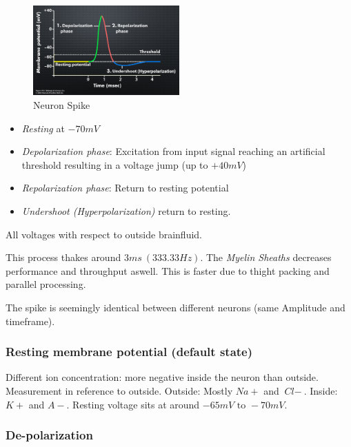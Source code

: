 \documentclass[
    fontsize      = 11pt,
    paper         = a4,
    twoside       = false,
    parskip       = half,
    pagesize      = false,
]{scrartcl}
\providecommand{\tightlist}{%
  \setlength{\itemsep}{0pt}\setlength{\parskip}{0pt}}
\begin{document}
\begin{figure}[htp]
\centering
\includegraphics[width=0.5\textwidth]{neuron-spike.png}
\caption{Neuron Spike}
\end{figure}

\begin{itemize}
\tightlist
\item
  \emph{Resting} at \(-70\si{mV}\)
\item
  \emph{Depolarization phase}: Excitation from input signal reaching an
  artificial threshold resulting in a voltage jump (up to
  \(+40\si{mV}\))
\item
  \emph{Repolarization phase}: Return to resting potential
\item
  \emph{Undershoot (Hyperpolarization)} return to resting.
\end{itemize}

All voltages with respect to outside brainfluid.

This process thakes around \(3\si{ms}\ \left( 333.33\si{Hz} \right)\).
The \emph{Myelin Sheaths} decreases performance and throughput aswell.
This is faster due to thight packing and parallel processing.

The spike is seemingly identical between different neurons (same
Amplitude and timeframe).

\hypertarget{resting-membrane-potential-default-state}{%
\subsubsection{Resting membrane potential (default
state)}\label{resting-membrane-potential-default-state}}

Different ion concentration: more negative inside the neuron than
outside. Measurement in reference to outside. Outside: Mostly
\(\mathit{Na}+\) and \(\textit{Cl}-\). Inside: \(\mathit{K}+\) and
\(\mathit{A}-\). Resting voltage sits at around
\(-65\si{mV} \text{ to } -70\si{mV}\).

\hypertarget{de-polarization}{%
\subsubsection{De-polarization}\label{de-polarization}}
\end{document}
